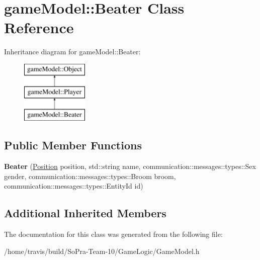 \hypertarget{classgame_model_1_1_beater}{\section{game\-Model\-:\-:Beater Class Reference}
\label{classgame_model_1_1_beater}
}
Inheritance diagram for game\-Model\-:\-:Beater\-:\begin{figure}[H]
\begin{center}
\leavevmode
\includegraphics[height=3.000000cm]{classgame_model_1_1_beater}
\end{center}
\end{figure}
\subsection*{Public Member Functions}
\begin{DoxyCompactItemize}
\item 
\hypertarget{classgame_model_1_1_beater_ae2b91b72f61e55459889a89e1c5ebdac}{{\bfseries Beater} (\hyperlink{structgame_model_1_1_position}{Position} position, std\-::string name, communication\-::messages\-::types\-::\-Sex gender, communication\-::messages\-::types\-::\-Broom broom, communication\-::messages\-::types\-::\-Entity\-Id id)}\label{classgame_model_1_1_beater_ae2b91b72f61e55459889a89e1c5ebdac}

\end{DoxyCompactItemize}
\subsection*{Additional Inherited Members}


The documentation for this class was generated from the following file\-:\begin{DoxyCompactItemize}
\item 
/home/travis/build/\-So\-Pra-\/\-Team-\/10/\-Game\-Logic/Game\-Model.\-h\end{DoxyCompactItemize}
